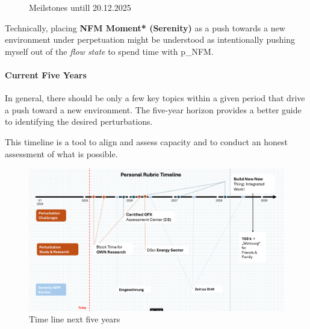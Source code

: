 \begin{figure}[H]
\caption{Meilstones untill 20.12.2025}
\end{figure}



Technically, placing \textbf{NFM Moment* (Serenity)} as a push towards a new environment under perpetuation might be understood as intentionally pushing myself out of the \textit{flow state} to spend time with \gls{p_NFM}.

\paragraph{Current Five Years}

In general, there should be only a few key topics within a given period that drive a push toward a new environment. The five-year horizon provides a better guide to identifying the desired perturbations.

This timeline is a tool to align and assess capacity and to conduct an honest assessment of what is possible.

\begin{figure}[H]  
	\centering  
	\includegraphics[scale=0.3]{attachment/chapter_OWN/Personal_Rubric__Timeline_II}
	\caption{Time line next five years}  
\end{figure}

